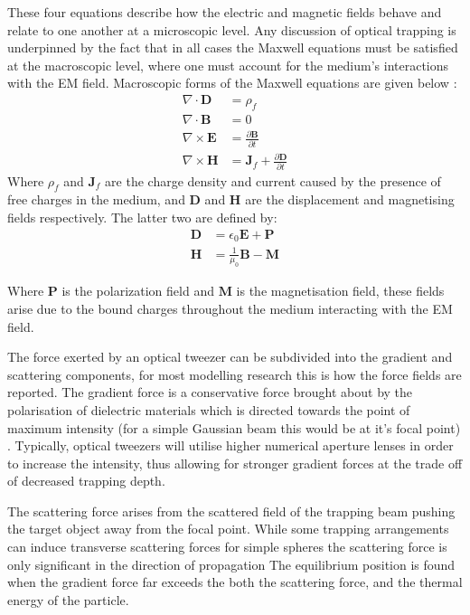 These four equations describe how the electric and magnetic fields behave
and relate to one another at a microscopic level. Any discussion 
of optical trapping is underpinned by the fact that in all cases the 
Maxwell equations must be satisfied at the macroscopic level, where 
one must account for the medium's interactions with the EM field. 
Macroscopic forms of the Maxwell equations are given below \cite{Jackson_1975}:
\begin{align}
	\nabla \cdot \mathbf{D}
	&= \rho_f
	\\
	\nabla \cdot \mathbf{B}
	&= 0
	\\
	\nabla \times \mathbf{E}
	&= \frac{\partial \mathbf{B}}{\partial t}
	\\
	\nabla \times \mathbf{H}
	&= \mathbf{J}_f +\frac{\partial \mathbf{D}}{\partial t}  
\end{align}
Where $\rho_f$ and $\mathbf{J}_f$ are the charge density and current 
caused by the presence of free charges in the medium, and $\mathbf{D}$ 
and $\mathbf{H}$ are the displacement and magnetising fields respectively. 
The latter two are defined by:
\begin{align}
	\mathbf{D} &= \epsilon_0\mathbf{E}+\mathbf{P} 
	\\ 
	\mathbf{H} &= \frac{1}{\mu_0}\mathbf{B}-\mathbf{M}
\end{align}

Where $\mathbf{P}$ is the polarization field and $\mathbf{M}$ is the 
magnetisation field, these fields arise due to the bound charges 
throughout the medium interacting with the EM field. 

The force exerted by an optical tweezer can be subdivided into the 
gradient and scattering components, for most modelling research this 
is how the force fields are reported. The gradient force is a 
conservative force brought about by the polarisation of dielectric 
materials which is directed towards the point of maximum intensity 
(for a simple Gaussian beam this would be at it's focal point) \cite{YasuhiroHarada1996}. Typically, optical tweezers will utilise 
higher numerical aperture lenses in order to increase the intensity, 
thus allowing for stronger gradient forces at the trade off of 
decreased trapping depth.

The scattering force arises from the scattered field of the trapping 
beam pushing the target object away from the focal point. While some 
trapping arrangements can induce transverse scattering forces for 
simple spheres the scattering force is only significant in the direction
of propagation \cite{Capitanio2002} The equilibrium position is found 
when the gradient force far exceeds the both the scattering force, 
and the thermal energy of the particle. 

